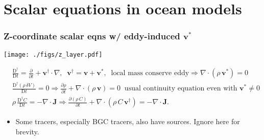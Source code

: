 \documentclass[10pt]{beamer}
\begin{document}
\section{Scalar equations in ocean models}

\begin{frame}
  \frametitle{Z-coordinate scalar eqns w/ eddy-induced ${\bm v}^{*}$}

\begin{center}
\vspace{-.3cm}
{\texttt{[image: ./figs/z\_layer.pdf]}}
\end{center}
\vspace{-.5cm}

\begin{align}
 &\frac{\mathrm{D}^{\dagger}}{\mathrm{D}t} = \frac{\partial }{\partial t} + {\bm v}^{\dagger} \cdot \nabla, 
 \; \; {\bm v}^{\dagger} = {\bm v} + {\bm v}^{*},  \; \; 
 \mbox{local mass conserve eddy}  \Longrightarrow   \nabla \cdot (\rho \, {\bm v}^{*}) = 0 
\\
 &\frac{\mathrm{D}^{\dagger} ( \rho \, \delta V)}{\mathrm{D}t} = 0  \Longrightarrow  
   \frac{\partial \rho}{\partial t} + \nabla \cdot (\rho \, {\bm v}) = 0  
 \; \;  \mbox{usual continuity equation even with ${\bm v}^{*} \ne 0$}
\\
  &\rho \, \frac{\mathrm{D}^{\dagger} C }{\mathrm{D}t} = -\nabla \cdot {\bm J}  \Longrightarrow  
   \frac{\partial (\rho \, C) }{\partial t} + \nabla \cdot (\rho \, C \, {\bm v}^{\dagger} ) = - \nabla \cdot {\bm J}.
\label{eq:z-coordinate-mass-tracer-equation}
\end{align}


\vspace{-.3cm}
\begin{exampleblock}{}
\begin{itemize}
\item Some tracers, especially BGC tracers, also have sources.  Ignore here for brevity.  
\end{itemize}
\end{exampleblock}{}

\end{frame}
\end{document}
